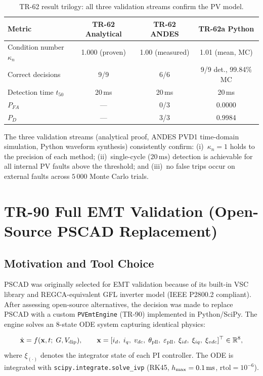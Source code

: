 \documentclass[11pt, a4paper]{article}
\newcommand{\kn}{\kappa_n}
\begin{document}
\begin{table}[!t]
\centering
\caption{TR-62 result trilogy: all three validation streams confirm the PV model.}
\label{tab:trilogy}
\renewcommand{\arraystretch}{1.10}
\begin{tabular}{lccc}
\toprule
Metric & TR-62 Analytical & TR-62 ANDES & TR-62a Python \\
\midrule
Condition number $\kn$     & 1.000 (proven) & 1.00 (measured) & 1.01 (mean, MC) \\
Correct decisions          & 9/9            & 6/6             & 9/9 det., 99.84\% MC \\
Detection time $t_{50}$    & 20\,ms         & 20\,ms          & 20\,ms \\
$P_{FA}$                   & ---            & 0/3             & 0.0000 \\
$P_D$                      & ---            & 3/3             & 0.9984 \\
\bottomrule
\end{tabular}
\end{table}

The three validation streams (analytical proof, ANDES PVD1 time-domain
simulation, Python waveform synthesis) consistently confirm:
(i)~$\kn=1$ holds to the precision of each method;
(ii)~single-cycle ($20\,\text{ms}$) detection is achievable for all internal
PV faults above the threshold; and
(iii)~no false trips occur on external faults across $5\,000$ Monte Carlo trials.

\section{TR-90 Full EMT Validation (Open-Source PSCAD Replacement)}
\label{sec:emt}

\subsection{Motivation and Tool Choice}

PSCAD was originally selected for EMT validation because of its built-in VSC
library and REGCA-equivalent GFL inverter model (IEEE P2800.2 compliant).
After assessing open-source alternatives, the decision was made to replace
PSCAD with a custom \texttt{PVEmtEngine} (TR-90) implemented in Python/SciPy.
The engine solves an 8-state ODE system capturing identical physics:

\begin{equation}
  \dot{\mathbf{x}} = f(\mathbf{x}, t;\; G, V_{\rm dip}),
  \qquad
  \mathbf{x} = [i_d,\; i_q,\; v_{dc},\; \theta_{\rm pll},\; \varepsilon_{\rm pll},\;
                \xi_{id},\; \xi_{iq},\; \xi_{vdc}]^\top \in \mathbb{R}^8,
  \label{eq:emt_ode}
\end{equation}
where $\xi_{(\cdot)}$ denotes the integrator state of each PI controller.
The ODE is integrated with \texttt{scipy.integrate.solve\_ivp} (RK45,
$h_{\rm max} = 0.1\,\text{ms}$, $\text{rtol} = 10^{-6}$).
\end{document}
